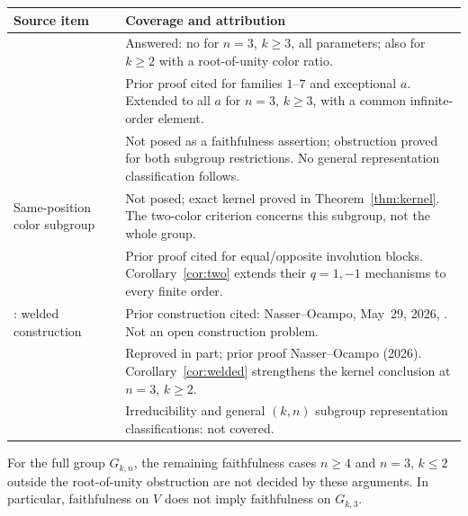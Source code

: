 \documentclass[11pt]{article}
\begin{document}
\begin{center}
\small
\begin{tabularx}{\linewidth}{@{}>{\raggedright\arraybackslash}p{.34\linewidth}>{\raggedright\arraybackslash}X@{}}
\toprule
Source item & Coverage and attribution\\
\midrule
\cite[Question~4.3, p.~17]{KMPN}
& Answered: no for $n=3$, $k\ge3$, all parameters; also for
$k\ge2$ with a root-of-unity color ratio.\\
\cite[Theorem~4.2(a)--(b), p.~17]{KMPN}
& Prior proof cited for families $1$--$7$ and exceptional $a$.
Extended to all $a$ for $n=3$, $k\ge3$, with a common infinite-order element.\\
\cite[Sections~3.1--3.2; Section~6]{KMPN}
& Not posed as a faithfulness assertion; obstruction proved for
both subgroup restrictions. No general representation classification follows.\\
Same-position color subgroup
& Not posed; exact kernel proved in Theorem~\ref{thm:kernel}.
The two-color criterion concerns this subgroup, not the whole group.\\
\cite[Theorem~11(2), p.~7]{NCD}
& Prior proof cited for equal/opposite involution blocks.
Corollary~\ref{cor:two} extends their $q=1,-1$ mechanisms to every finite order.\\
\cite[Section~6, p.~26]{KMPN}: welded construction
& Prior construction cited: Nasser--Ocampo, May~29, 2026,
\cite[Definition~2.1]{NO}. Not an open construction problem.\\
\cite[Proposition~3.4, p.~12]{NO}
& Reproved in part; prior proof Nasser--Ocampo (2026).
Corollary~\ref{cor:welded} strengthens the kernel conclusion at $n=3$, $k\ge2$.\\
\cite[Theorems~4.4, 5.3--5.4; Section~6]{KMPN}
& Irreducibility and general $(k,n)$ subgroup representation
classifications: not covered.\\
\bottomrule
\end{tabularx}
\end{center}
For the full group $G_{k,n}$, the remaining faithfulness cases
$n\ge4$ and $n=3$, $k\le2$ outside the root-of-unity obstruction
are not decided by these arguments. In particular, faithfulness on $V$
does not imply faithfulness on $G_{k,3}$.
\end{document}
